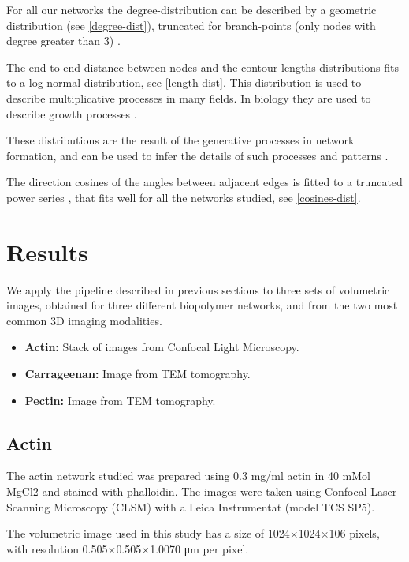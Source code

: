 For all our networks the degree-distribution can be described by a geometric distribution (see \autoref{degree-dist}), truncated for branch-points (only nodes with degree greater than 3) .

The end-to-end distance between nodes and the contour lengths distributions fits to a
log-normal distribution, see \autoref{length-dist}. This distribution is used to describe multiplicative processes in many fields.
In biology they are used to describe growth processes \cite{mitzenmacher_brief_2004}.

These distributions are the result of the generative processes in network formation, and can be used to infer the details of such processes and patterns \cite{frank_common_2009, frank_how_2014}.

The direction cosines of the angles between adjacent edges is fitted to a truncated power series \cite{lindstrom_finite-strain_2013}, that fits well for all the networks studied, see \autoref{cosines-dist}.

\section{Results}%
\label{sec:sg_results}

We apply the pipeline described in previous sections to three sets of volumetric images, obtained for three different biopolymer networks, and from the two most common 3D imaging modalities.

\begin{itemize}[topsep=0pt]
  \item \textbf{Actin: } Stack of images from Confocal Light Microscopy.
  \item \textbf{Carrageenan: } Image from \gls{TEM} tomography.
  \item \textbf{Pectin: } Image from \gls{TEM} tomography.
\end{itemize}

\subsection{Actin}%
\label{sub:actin}
The actin network studied was prepared using 0.3 mg/ml actin in 40 mMol MgCl2 and stained with phalloidin.
The images were taken using Confocal Laser Scanning Microscopy (CLSM) with a Leica Instrumentat (model TCS SP5).

The volumetric image used in this study has a size of 1024$\times$1024$\times$106 pixels, with resolution 0.505$\times$0.505$\times$1.0070 \si{\micro\metre} per pixel.


